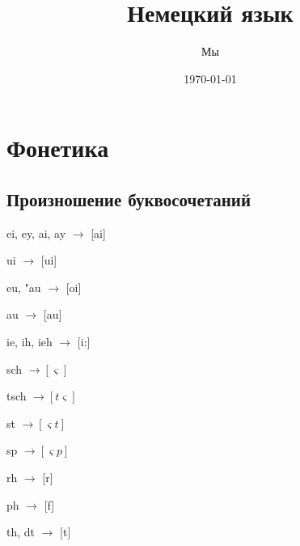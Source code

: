 \documentclass[oneside]{book}
\title{Немецкий язык}
\date{\today}
\author{Мы}
\begin{document}
	\maketitle

	\chapter{Фонетика}
	\section{Произношение буквосочетаний}
	ei, ey, ai, ay
	\begin{math}
		\longrightarrow
	\end{math}
	[ai]

	ui
	\begin{math}
		\longrightarrow
	\end{math}
	[ui]

	eu, "au
	\begin{math}
		\longrightarrow
	\end{math}
	[oi]

	au
	\begin{math}
		\longrightarrow
	\end{math}
	[au]

	ie, ih, ieh
	\begin{math}
		\longrightarrow
	\end{math}
	[i:]

	sch
	\begin{math}
		\longrightarrow [\varsigma]
	\end{math}

	tsch
	\begin{math}
		\longrightarrow [t\varsigma]
	\end{math}

	st
	\begin{math}
		\longrightarrow [\varsigma t]
	\end{math}

	sp
	\begin{math}
		\longrightarrow [\varsigma p]
	\end{math}

	rh
	\begin{math}
		\longrightarrow
	\end{math}
	[r]

	ph
	\begin{math}
		\longrightarrow
	\end{math}
	[f]

	th, dt
	\begin{math}
		\longrightarrow
	\end{math}
	[t]
\end{document}
